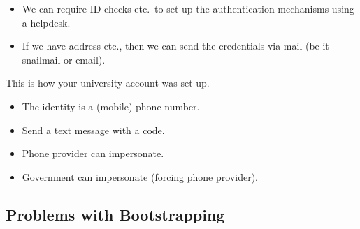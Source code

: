 \begin{frame}
  \begin{solution}
    \begin{itemize}
      \item We can require ID checks etc.\ to set up the authentication 
        mechanisms using a helpdesk.

        \pause{}

      \item If we have address etc., then we can send the credentials via mail 
        (be it snailmail or email).

    \end{itemize}
  \end{solution}

  \pause{}

  \begin{example}
    This is how your university account was set up.
  \end{example}
\end{frame}

\begin{frame}
  \begin{example}
    \begin{itemize}
      \item The identity is a (mobile) phone number.
      \item Send a text message with a code.
    \end{itemize}
  \end{example}

  \pause{}

  \begin{remark}
    \begin{itemize}
      \item Phone provider can impersonate.
      \item Government can impersonate (forcing phone provider).
    \end{itemize}
  \end{remark}
\end{frame}

\subsection{Problems with Bootstrapping}


